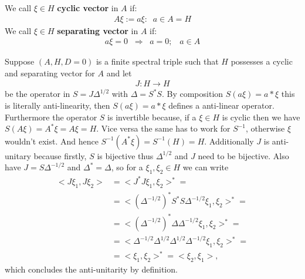 
\begin{mydefinition}
    We call $\xi \in H$ \textbf{cyclic vector} in $A$ if:
    \begin{align}
        A\xi := { a\xi:\;\; a\in A} = H
    \end{align}
    We call $\xi \in H$ \textbf{separating vector} in $A$ if:
    \begin{align}
        a\xi = 0\;\; \Rightarrow \;\; a=0;\;\;\; a\in A
    \end{align}
\end{mydefinition}
Suppose $(A, H, D = 0)$ is a finite spectral triple such that $H$ possesses a
cyclic and separating vector for $A$ and let
\begin{align}
    J: H \rightarrow H
\end{align}
be the operator in $S = J \Delta ^{1/2}$ with $\Delta = S^*S$. By composition
$S(a\xi) = a*\xi$ this is literally anti-linearity, then $S(a \xi) = a* \xi$
defines a anti-linear operator. Furthermore the operator $S$ is invertible
because, if a $\xi \in H$ is cyclic then we have $S(A\xi) = A^*\xi = A\xi =
H$. Vice versa the same has to work for $S^{-1}$, otherwise $\xi$ wouldn't
exist. And hence $S^{-1}(A^*\xi) = S^{-1}(H) = H$. Additionally $J$ is
anti-unitary because firstly, $S$ is bijective thus $\Delta ^{1/2}$ and $J$ need to be bijective.
Also have $J = S \Delta^{-1/2}$ and $\Delta^* = \Delta$, so for a $\xi _1 ,
\xi _2 \in H$ we can write
\begin{align}
    <J \xi _1 , J \xi _2 > &= < J^*J\xi_1 , \xi_2>^* =\nonumber\\
    &= <(\Delta ^{-1/2})^* S^* S \Delta ^{-1/2} \xi_1, \xi_2>^* =\nonumber \\
    &= <(\Delta^{-1/2})^* \Delta \Delta^{-1/2} \xi_1, \xi_2>^* =\nonumber\\
    &= <\Delta^{-1/2} \Delta^{1/2}\Delta^{1/2} \Delta^{-1/2} \xi_1, \xi_2>^*
    =\nonumber\\
    &= <\xi _1, \xi_2>^* = <\xi_2 , \xi_1>,
\end{align}
which concludes the anti-unitarity by definition.
